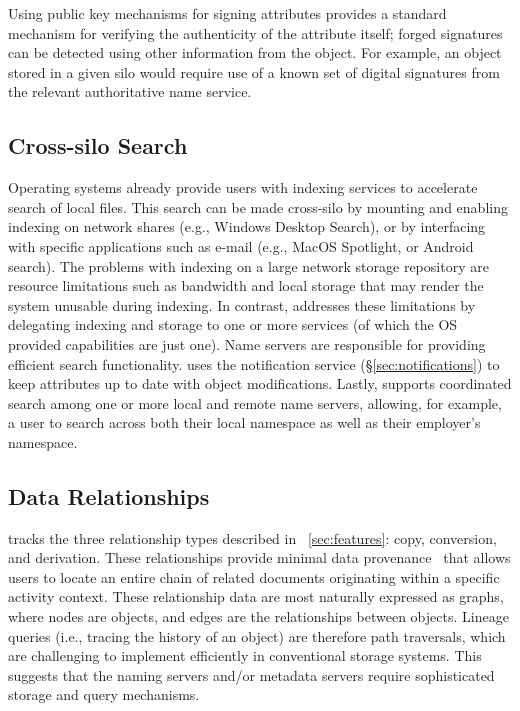 Using public key mechanisms for signing attributes provides a standard mechanism for verifying the authenticity of the attribute itself; forged signatures can be detected using other information from the \system object.  For example, an object stored in a given silo would require use of a known set of digital signatures from the relevant authoritative name service. 

\subsection{Cross-silo Search} 
\label{sec:cross-silo-search} 
Operating systems already provide users with indexing services to accelerate search of local files. This search can be made cross-silo by mounting and enabling indexing on network shares (e.g., Windows Desktop Search), or by interfacing with specific applications such as e-mail (e.g., MacOS Spotlight, or Android search). The problems with indexing on a large network storage repository are resource limitations such as bandwidth and local storage that may render the system unusable during indexing. In contrast, \system addresses these limitations by delegating indexing and storage to one or more services (of which the OS provided capabilities are just one).
Name servers are responsible for providing efficient search functionality. \system uses the notification service (\S\ref{sec:notifications}) to keep attributes up to date with object modifications. Lastly, \system supports coordinated search among one or more local and remote name servers, allowing, for example, a user to search across both their local namespace as well as their employer's namespace.

\subsection{Data Relationships} 
\label{sec:data-prov}
\system tracks the three relationship types described in ~\autoref{sec:features}: copy, conversion, and derivation. These relationships provide minimal data provenance~\cite{provprimer} that allows users to locate an entire chain of related documents originating within a specific activity context.
These relationship data are most naturally expressed as graphs, where nodes are objects, and edges are the relationships between objects.
Lineage queries (i.e., tracing the history of an object) are therefore path traversals, which are challenging to implement efficiently in conventional storage systems.
This suggests that the naming servers and/or metadata servers require  sophisticated storage and query mechanisms.

